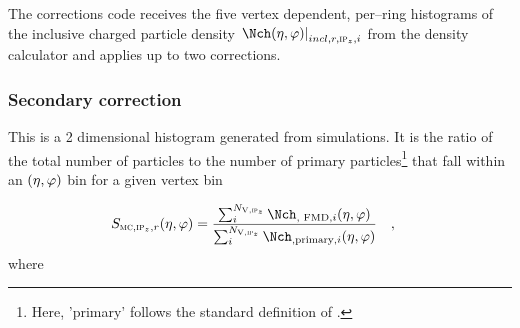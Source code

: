 The corrections code receives the five vertex dependent,
per--ring histograms of the inclusive charged particle density
$\dndetadphi[incl,r,\subIPz,i]$ from the density calculator and applies
up to two corrections.   

\subsubsection{Secondary correction}
\label{sec:sub:sub:secmap}
This is a 2 dimensional histogram generated from simulations. It is
the ratio of the total number of particles to the number of primary
particles\footnote{Here, 'primary' follows the standard definition of
  \ALICE{}.} that fall within an $(\eta,\varphi)$ bin for a given vertex bin

\begin{align}
  \label{eq:secondary}
  \SecMap{} &=
  \frac{\sum_i^{\NV[,\subIPz]}\mult[,\text{\FMD{}},i]\etaphi}{
    \sum_i^{\NV[,\subIPz]}\mult[,\text{primary},i]\etaphi}\quad,
\end{align}
where 


